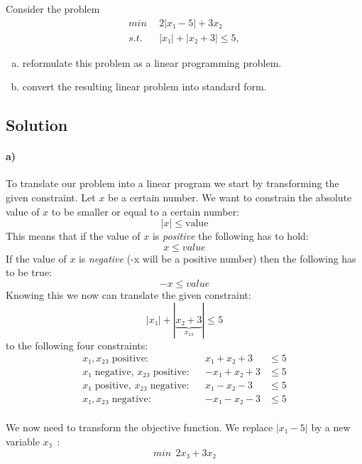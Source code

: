 \documentclass[a4paper, 12pt]{report}
\begin{document}
Consider the problem
\begin{align*}
    min  ~&~ 2|x₁ − 5| + 3x₂\\
    s.t. ~&~ |x₁| + |x₂ + 3| ≤ 5,
\end{align*}

\begin{enumerate}[a)]
    \item reformulate this problem as a linear programming problem.
    \item convert the resulting linear problem into standard form.
\end{enumerate}

\subsection{Solution}

\paragraph{a)} To translate our problem into a linear program we start by
transforming the given constraint. Let $x$ be a certain number. We want to
constrain the absolute value of $x$ to be smaller or equal to a certain number:
\[
    |x|≤\text{value}
\]
This means that if the value of $x$ is \emph{positive} the following has to
hold:
\[
    x≤value
\]
If the value of $x$ is \emph{negative} (-x will be a positive number) then the
following has to be true:
\[
    -x≤value
\]
Knowing this we now can translate the given constraint:
\[
    |x₁| + |\underbrace{x₂ + 3}_{x₂₃}| ≤ 5
\]
to the following four constraints:
\begin{align*}
    &&&& \text{$x₁, x₂₃$ positive:}            &&  x₁ + x₂ + 3  & ≤ 5 &&&&\\
    &&&& \text{$x₁$ negative, $x₂₃$ positive:} && -x₁ + x₂ + 3  & ≤ 5 &&&&\\
    &&&& \text{$x₁$ positive, $x₂₃$ negative:} &&  x₁ - x₂ - 3  & ≤ 5 &&&&\\
    &&&& \text{$x₁, x₂₃$ negative:}            && -x₁ - x₂ - 3  & ≤ 5 &&&&\\
\end{align*}

We now need to transform the objective function. We replace $|x₁-5|$ by a new
variable $x₃$~\cite{LP_Solve_Absolute_Values}:
\[
    min ~~ 2x₃+ 3x₂
\]
\end{document}
